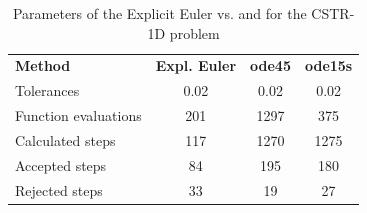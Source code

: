 \begin{table}[H]
    \centering
    \begin{tabular}{@{}l|c|c|c@{}}
    \toprule
    \textbf{Method}      & \textbf{Expl. Euler} & \textbf{ode45} & \textbf{ode15s} \\
    Tolerances           & 0.02                 & 0.02           & 0.02            \\ \midrule
    Function evaluations & 201                  & 1297           & 375             \\
    Calculated steps     & 117                  & 1270           & 1275            \\
    Accepted steps       & 84                   & 195            & 180             \\
    Rejected steps       & 33                   & 19             & 27              \\ \bottomrule
    \end{tabular}
    \caption{Parameters of the Explicit Euler vs.  and  for the CSTR-1D problem}
    \label{2_6_1D_table}
\end{table}
